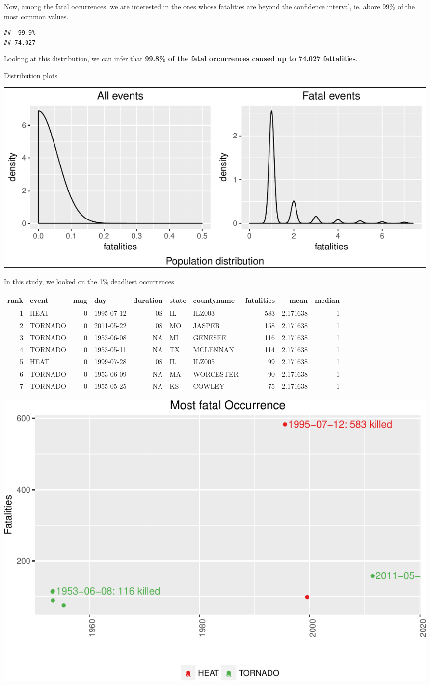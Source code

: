 \documentclass[]{article}
\begin{document}
Now, among the fatal occurrences, we are interested in the ones whose
fatalities are beyond the confidence interval, ie. above 99\% of the
most common values.

\begin{verbatim}
##  99.9% 
## 74.027
\end{verbatim}

Looking at this distribution, we can infer that \textbf{99.8\% of the
fatal occurrences caused up to 74.027 fattalities}.

Distribution plots

\includegraphics{readme_files/figure-latex/fatal-distr-4-1.pdf}

In this study, we looked on the 1\% deadliest occurrences.

\begin{longtable}[]{@{}rlrlrllrrr@{}}
\toprule
rank & event & mag & day & duration & state & countyname & fatalities &
mean & median\tabularnewline
\midrule
\endhead
1 & HEAT & 0 & 1995-07-12 & 0S & IL & ILZ003 & 583 & 2.171638 &
1\tabularnewline
2 & TORNADO & 0 & 2011-05-22 & 0S & MO & JASPER & 158 & 2.171638 &
1\tabularnewline
3 & TORNADO & 0 & 1953-06-08 & NA & MI & GENESEE & 116 & 2.171638 &
1\tabularnewline
4 & TORNADO & 0 & 1953-05-11 & NA & TX & MCLENNAN & 114 & 2.171638 &
1\tabularnewline
5 & HEAT & 0 & 1999-07-28 & 0S & IL & ILZ005 & 99 & 2.171638 &
1\tabularnewline
6 & TORNADO & 0 & 1953-06-09 & NA & MA & WORCESTER & 90 & 2.171638 &
1\tabularnewline
7 & TORNADO & 0 & 1955-05-25 & NA & KS & COWLEY & 75 & 2.171638 &
1\tabularnewline
\bottomrule
\end{longtable}

\includegraphics{readme_files/figure-latex/fatal-plot-single-1.pdf}
\end{document}
